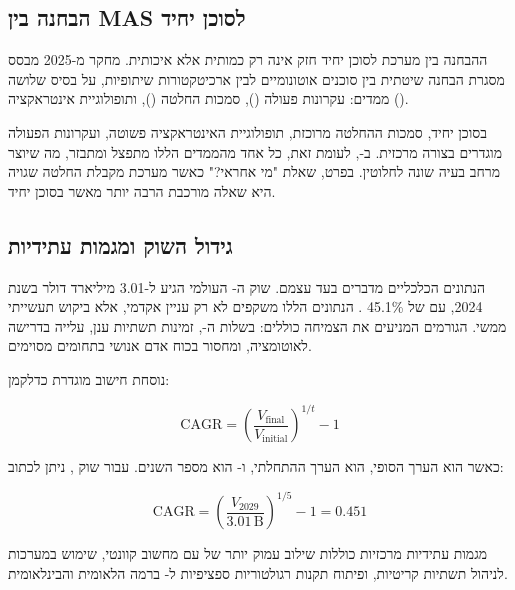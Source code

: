 \documentclass[12pt,a4paper]{article}
\begin{document}
\subsection{הבחנה בין MAS לסוכן יחיד}

ההבחנה בין מערכת  לסוכן יחיד חזק אינה רק כמותית אלא איכותית. מחקר מ-2025 \cite{arXiv2506} מבסס מסגרת הבחנה שיטתית בין סוכנים אוטונומיים לבין ארכיטקטורות  שיתופיות, על בסיס שלושה ממדים: עקרונות פעולה (), סמכות החלטה (), ותופולוגיית אינטראקציה ().

בסוכן יחיד, סמכות ההחלטה מרוכזת, תופולוגיית האינטראקציה פשוטה, ועקרונות הפעולה מוגדרים בצורה מרכזית. ב-, לעומת זאת, כל אחד מהממדים הללו מתפצל ומתבזר, מה שיוצר מרחב בעיה שונה לחלוטין. בפרט, שאלת "מי אחראי?" כאשר מערכת  מקבלת החלטה שגויה היא שאלה מורכבת הרבה יותר מאשר בסוכן יחיד.

\subsection{גידול השוק ומגמות עתידיות}

הנתונים הכלכליים מדברים בעד עצמם. שוק ה- העולמי הגיע ל-3.01 מיליארד דולר בשנת 2024, עם  של 45.1\% \cite{MarketUS2024}. הנתונים הללו משקפים לא רק עניין אקדמי, אלא ביקוש תעשייתי ממשי. הגורמים המניעים את הצמיחה כוללים: בשלות ה-, זמינות תשתיות ענן, עלייה בדרישה לאוטומציה, ומחסור בכוח אדם אנושי בתחומים מסוימים.

נוסחת חישוב  מוגדרת כדלקמן:

\begin{equation}
  \text{CAGR} = \left(\frac{V_{\text{final}}}{V_{\text{initial}}}\right)^{1/t} - 1
  \label{eq:cagr}
\end{equation}

כאשר  הוא הערך הסופי,  הוא הערך ההתחלתי, ו- הוא מספר השנים. עבור שוק , ניתן לכתוב:

\begin{equation}
  \text{CAGR} = \left(\frac{V_{2029}}{3.01\,\text{B}}\right)^{1/5} - 1 = 0.451
  \label{eq:cagr_mas}
\end{equation}

מגמות עתידיות מרכזיות כוללות שילוב עמוק יותר של  עם מחשוב קוונטי, שימוש במערכות  לניהול תשתיות קריטיות, ופיתוח תקנות רגולטוריות ספציפיות ל- ברמה הלאומית והבינלאומית.

\newpage
\end{document}
